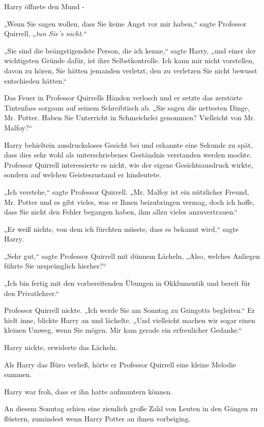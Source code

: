 {Harry öffnete den Mund -

„Wenn Sie sagen wollen, dass Sie keine Angst vor mir haben,“ sagte Professor Quirrell, „\emph{tun Sie's nicht.}“

„Sie sind die beängstigendste Person, die ich kenne,“ sagte Harry, „und einer der wichtigsten Gründe dafür, ist ihre Selbstkontrolle. Ich kann mir nicht vorstellen, davon zu hören, Sie hätten jemanden verletzt, den zu verletzen Sie nicht bewusst entschieden hätten.“

Das Feuer in Professor Quirrells Händen verlosch und er setzte das zerstörte Tintenfass sorgsam auf seinem Schreibtisch ab. „Sie sagen die nettesten Dinge, Mr. Potter. Haben Sie Unterricht in Schmeichelei genommen? Vielleicht von Mr. Malfoy?“

Harry behieltein ausdrucksloses Gesicht bei und erkannte eine Sekunde zu spät, dass dies sehr wohl als unterschriebenes Geständnis verstanden werden mochte. Professor Quirrell interessierte es nicht, wie der eigene Gesichtsausdruck wirkte, sondern auf welchen Geisteszustand er hindeutete.

„Ich verstehe,“ sagte Professor Quirrell. „Mr. Malfoy ist ein nützlicher Freund, Mr. Potter und es gibt vieles, was er Ihnen beizubringen vermag, doch ich hoffe, dass Sie nicht den Fehler begangen haben, ihm allzu vieles anzuvertrauen.“

„Er weiß nichts, von dem ich fürchten müsste, dass es bekannt wird,“ sagte Harry.

„Sehr gut,“ sagte Professor Quirrell mit dünnem Lächeln, „Also, welches Anliegen führte Sie ursprünglich hierher?“

„Ich bin fertig mit den vorbereitenden Übungen in Okklumentik und bereit für den Privatlehrer.“

Professor Quirrell nickte. „Ich werde Sie am Sonntag zu Gringotts begleiten.“ Er hielt inne, blickte Harry an und lächelte. „Und vielleicht machen wir sogar einen kleinen Umweg, wenn Sie mögen. Mir kam gerade ein erfreulicher Gedanke.“

Harry nickte, erwiderte das Lächeln.

Als Harry das Büro verließ, hörte er Professor Quirrell eine kleine Melodie summen.

Harry war froh, dass er ihn hatte aufmuntern können.

\later

An diesem Sonntag schien eine ziemlich große Zahl von Leuten in den Gängen zu flüstern, zumindest wenn Harry Potter an ihnen vorbeiging.

}
